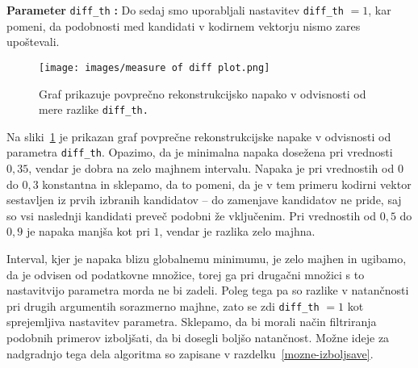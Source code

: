 \documentclass[12pt,a4paper,twoside]{article}
\theoremstyle{definition} %
\theoremstyle{plain} %
\numberwithin{equation}{section}  %
\begin{document}

\textbf{Parameter} \texttt{diff\_th} \textbf{:} Do sedaj smo uporabljali nastavitev \texttt{diff\_th} $=1$, kar pomeni, da podobnosti med kandidati v kodirnem vektorju nismo zares upoštevali.
\begin{figure}[h]
	\centering
	\texttt{[image: images/measure of diff plot.png]}
	\caption[Graf napake glede na mero razlike.]{Graf prikazuje povprečno rekonstrukcijsko napako v odvisnosti od mere razlike \texttt{diff\_th.}}
	\label{fig:measure_of_diff}
\end{figure}
Na sliki~\ref{fig:measure_of_diff} je prikazan graf povprečne rekonstrukcijske napake v odvisnosti od parametra \texttt{diff\_th}.
Opazimo, da je minimalna napaka dosežena pri vrednosti $0,35$, vendar je dobra na zelo majhnem intervalu.
Napaka je pri vrednostih od $0$ do $0,3$ konstantna in sklepamo, da to pomeni, da je v tem primeru kodirni vektor sestavljen iz prvih izbranih kandidatov
-- do zamenjave kandidatov ne pride, saj so vsi naslednji kandidati preveč podobni že vključenim.
Pri vrednostih od $0,5$ do $0,9$ je napaka manjša kot pri $1$, vendar je razlika zelo majhna.

Interval, kjer je napaka blizu globalnemu minimumu, je zelo majhen in ugibamo, da je odvisen od podatkovne množice, torej ga pri drugačni množici s to nastavitvijo parametra morda ne bi zadeli.
Poleg tega pa so razlike v natančnosti pri drugih argumentih sorazmerno majhne, zato se zdi \texttt{diff\_th} $=1$ kot sprejemljiva nastavitev parametra.
Sklepamo, da bi morali način filtriranja podobnih primerov izboljšati, da bi dosegli boljšo natančnost.
Možne ideje za nadgradnjo tega dela algoritma so zapisane v razdelku~\ref{mozne-izboljsave}.


\end{document}

